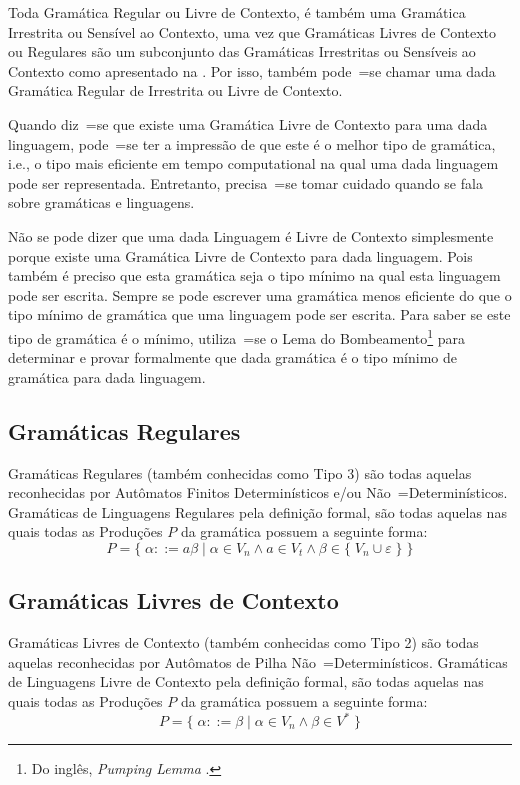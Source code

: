 Toda Gramática Regular ou
Livre de Contexto,
é também uma Gramática Irrestrita ou
Sensível ao Contexto,
uma vez que Gramáticas Livres de Contexto ou
Regulares são um subconjunto das Gramáticas Irrestritas ou
Sensíveis ao Contexto como apresentado na .
Por isso,
também pode~=se chamar uma dada Gramática Regular de Irrestrita ou
Livre de Contexto.

Quando diz~=se que existe uma Gramática Livre de Contexto para uma dada linguagem,
pode~=se ter a impressão de que este é o melhor tipo de gramática,
i.e.,
o tipo mais eficiente em tempo computational na qual uma dada linguagem pode ser representada.
Entretanto,
precisa~=se tomar cuidado quando se fala sobre gramáticas e
linguagens.

Não se pode dizer que uma dada Linguagem é Livre de Contexto simplesmente porque existe uma Gramática Livre de Contexto para dada linguagem.
Pois também é preciso que esta gramática seja o tipo mínimo na qual esta linguagem pode ser escrita.
Sempre se pode escrever uma gramática menos eficiente do que o tipo mínimo de gramática que uma linguagem pode ser escrita.
Para saber se este tipo de gramática é o mínimo,
utiliza~=se o Lema do Bombeamento\footnote{
Do inglês, \textit{Pumping Lemma} \cite{hopcroftBook,sipserBook}.
}
para determinar e
provar formalmente que dada gramática é o tipo mínimo de gramática para dada linguagem.


\subsection{Gramáticas Regulares}

Gramáticas Regulares (também conhecidas como Tipo 3) são todas aquelas reconhecidas por Autômatos Finitos Determinísticos e\slash{}ou Não~=Determinísticos.
Gramáticas de Linguagens Regulares pela definição formal,
são todas aquelas nas quais todas as Produções $P$ da gramática possuem a seguinte forma:
$$ P = \{\; \alpha ::= a \beta \;|\; \alpha \in V_n \land a \in V_t
            \land \beta \in \{\; V_n \cup \varepsilon\; \} \;\} $$

\subsection{Gramáticas Livres de Contexto}

Gramáticas Livres de Contexto (também conhecidas como Tipo 2) \cite{hopcroftBook} são todas aquelas reconhecidas por Autômatos de Pilha Não~=Determinísticos.
Gramáticas de Linguagens Livre de Contexto pela definição formal,
são todas aquelas nas quais todas as Produções $P$ da gramática possuem a seguinte forma:
$$ P = \{\; \alpha ::= \beta \;|\; \alpha \in V_n \land \beta \in V^* \;\} $$


